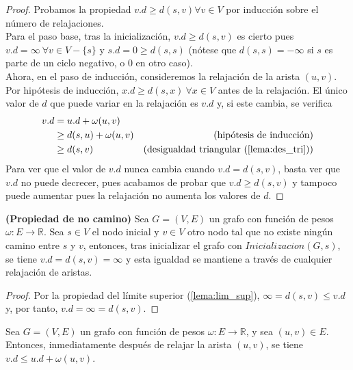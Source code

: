 \begin{proof}
	Probamos la propiedad $v.d \geq d(s,v) \forall v\in V$ por inducción sobre el número de relajaciones. \\
	Para el paso base, tras la inicialización, $v.d \geq d(s,v)$ es cierto pues $v.d = \infty\ \forall v\in V-\{s\}$ y $s.d=0\geq d(s,s)$ (nótese que $d(s,s)=-\infty$ si $s$ es parte de un ciclo negativo, o $0$ en otro caso). \\
	Ahora, en el paso de inducción, consideremos la relajación de la arista $(u,v)$. Por hipótesis de inducción, $x.d\geq d(s,x)\ \forall x\in V$ antes de la relajación. El único valor de $d$ que puede variar en la relajación es $v.d$ y, si este cambia, se verifica
	\begin{align*}
			v.d & =u.d + \omega(u,v) \\
			& \geq d(s,u) + \omega(u,v) & (\textrm{hipótesis de inducción}) \\
			& \geq d(s,v) & (\textrm{desigualdad triangular (\autoref{lema:des_tri})})
	\end{align*}
	Para ver que el valor de $v.d$ nunca cambia cuando $v.d=d(s,v)$, basta ver que $v.d$ no puede decrecer, pues acabamos de probar que $v.d\geq d(s,v)$ y tampoco puede aumentar pues la relajación no aumenta los valores de $d$.
\end{proof}

\begin{corolario}\label{cor:no_path}
	\textbf{(Propiedad de no camino)} Sea $G=(V,E)$ un grafo con función de pesos $\omega : E\rightarrow \mathbb{R}$. Sea $s\in V$ el nodo inicial y $v\in V$ otro nodo tal que no existe ningún camino entre $s$ y $v$, entonces, tras inicializar el grafo con $Inicializacion(G,s)$, se tiene $v.d=d(s,v)=\infty$ y esta igualdad se mantiene a través de cualquier relajación de aristas.
\end{corolario}

\begin{proof}
	Por la propiedad del límite superior (\autoref{lema:lim_sup}), $\infty=d(s,v)\leq v.d$ y, por tanto, $v.d=\infty =d(s,v).$
\end{proof}

\begin{lema}\label{lema:2.3}
	Sea $G=(V,E)$ un grafo con función de pesos $\omega : E\rightarrow \mathbb{R}$, y sea $(u,v)\in E$. Entonces, inmediatamente después de relajar la arista $(u,v)$, se tiene $v.d\leq u.d + \omega(u,v)$.
\end{lema}

